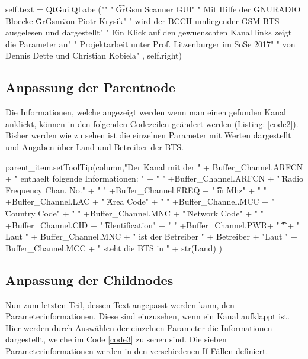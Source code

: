 \begin{code}[firstnumber=100,numbers=left,stepnumber=1, caption={Titelseite},captionpos=b,label={code1}]
self.text = QtGui.QLabel("\n"
                         " \t\t   GrGsm Scanner GUI\n\n\n"
                         " Mit Hilfe der GNURADIO Bloecke \"GrGsm\" von Piotr Krysik\n"
                         " wird der BCCH umliegender GSM BTS ausgelesen und dargestellt\n\n"
                         " Ein Klick auf den gewuenschten Kanal links zeigt die Parameter an\n\n\n\n\n\n\n\n\n\n\n"
                         " Projektarbeit unter Prof. Litzenburger im SoSe 2017\n"
                         " von Dennis Dette und Christian Kobiela\n\n"
                         , self.right)
\end{code} 
\noindent 

\subsection*{Anpassung der Parentnode}

Die Informationen, welche angezeigt werden wenn man einen gefunden Kanal anklickt, können in den folgenden Codezeilen geändert werden (Listing: \ref{code2}). Bisher werden wie zu sehen ist die einzelnen Parameter mit Werten dargestellt und Angaben über Land und Betreiber der BTS. 

\begin{code}[firstnumber=187,numbers=left,stepnumber=1, caption={Kanalinformation},captionpos=b,label={code2}]
parent_item.setToolTip(column,"Der Kanal mit der " + Buffer_Channel.ARFCN + 
		" enthaelt folgende Informationen: \n\n"
		+ " " +Buffer_Channel.ARFCN + " \t\tAbsolute Radio Frequency Chan. No.\n"
		+ " " +Buffer_Channel.FREQ + " \t\tFrequency in Mhz\n"
		+ " " +Buffer_Channel.LAC + " \t\tLocation Area Code\n"
		+ " " +Buffer_Channel.MCC + " \t\tMobile Country Code\n" 
		+ " " +Buffer_Channel.MNC + " \t\tMobile Network Code\n"
		+ " " +Buffer_Channel.CID + " \t\tCell Identification\n"			                        
		+ " " +Buffer_Channel.PWR+ " \t\tPower\n\n\n"
		+ " Laut " + Buffer_Channel.MNC + " ist der Betreiber " + Betreiber
		+ "\n Laut " + Buffer_Channel.MCC + " steht die BTS in " + str(Land)
		)
\end{code}

\subsection*{Anpassung der  Childnodes}

Nun zum letzten Teil, dessen Text angepasst werden kann, den Parameterinformationen. Diese sind einzusehen, wenn ein Kanal aufklappt ist. Hier werden durch Auswählen der einzelnen Parameter die Informationen dargestellt, welche im Code \ref{code3} zu sehen sind. Die sieben Parameterinformationen werden in den verschiedenen If-Fällen definiert. 


